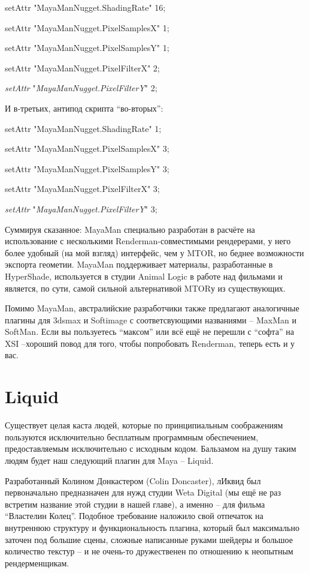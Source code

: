{\it   } setAttr
    "MayaManNugget.ShadingRate" 16;
  

   setAttr "MayaManNugget.PixelSamplesX"
    1;
  

   setAttr "MayaManNugget.PixelSamplesY"
    1;
  

   setAttr "MayaManNugget.PixelFilterX"
    2;
  

{\it    setAttr}  "{\it MayaManNugget}{\it .}{\it PixelFilterY}"
    2;
  

 И в-третьих,
    антипод скрипта “во-вторых”:
  

{\it   } setAttr
    "MayaManNugget.ShadingRate" 1;
  

   setAttr "MayaManNugget.PixelSamplesX"
    3;
  

   setAttr "MayaManNugget.PixelSamplesY"
    3;
  

   setAttr "MayaManNugget.PixelFilterX"
    3;
  

{\it    setAttr}  "{\it MayaManNugget}{\it .}{\it PixelFilterY}"
    3;
  

 Суммируя сказанное: MayaMan специально разработан в
    расчёте на использование с несколькими Renderman-совместимыми
    рендерерами, у него более удобный (на мой взгляд) интерфейс, чем у
    MTOR, но беднее возможности экспорта геометии. MayaMan поддерживает
    материалы, разработанные в HyperShade, используется в студии Animal
    Logic в работе над фильмами и является, по сути, самой сильной
    альтернативой MTORу из существующих.
  

 Помимо MayaMan, австралийские разработчики также
    предлагают аналогичные плагины для 3dsmax и Softimage с
    соответсвующими названиями – MaxMan и SoftMan. Если вы пользуетесь
    “максом” или всё ещё не перешли с “софта” на XSI –хороший повод для
    того, чтобы попробовать Renderman, теперь есть и у вас.
 
 \section*{Liquid}
  

 Существует целая каста людей, которые по
    принципиальным соображениям пользуются исключительно бесплатным
    программным обеспечением, предоставляемым исключительно с исходным
    кодом. Бальзамом на душу таким людям будет наш следующий плагин для
    Maya – Liquid.
  

 Разработанный Колином Донкастером (Colin Doncaster), лИквид был первоначально
    предназначен для нужд студии Weta Digital (мы ещё не раз встретим
    название этой студии в нашей главе), а именно – для фильма
    “Властелин Колец”. Подобное требование наложило свой отпечаток на
    внутреннюю структуру и функциональность плагина, который был
    максимально заточен под большие сцены, сложные написанные руками
    шейдеры и большое количество текстур – и не очень-то дружественен
    по отношению к неопытным рендерменщикам. 
  

